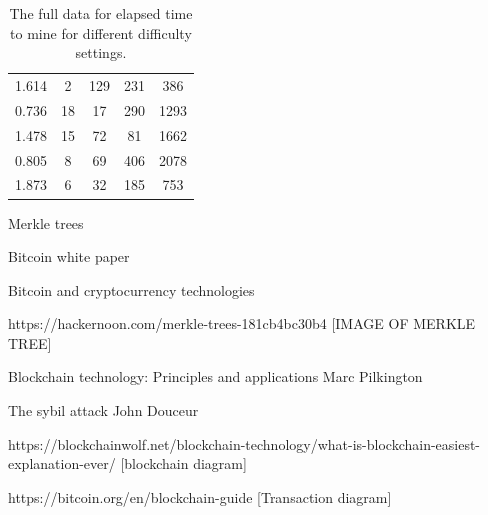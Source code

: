 \documentclass{l4proj}
\begin{document}
\begin{appendices}
\begin{table}[!ht]
\begin{tabular}{ccccc}
    1.614      & 2          & 129        & 231        & 386        \\
    0.736      & 18         & 17         & 290        & 1293       \\
    1.478      & 15         & 72         & 81         & 1662       \\
    0.805      & 8          & 69         & 406        & 2078       \\
    1.873      & 6          & 32         & 185        & 753       
    \end{tabular}
    \vspace{1cm}
    \caption{
        The full data for elapsed time to mine for different difficulty settings.
    }
    \label{tab:mining}
\end{table}
\end{appendices}






Merkle trees

Bitcoin white paper

Bitcoin and cryptocurrency technologies

https://hackernoon.com/merkle-trees-181cb4bc30b4
[IMAGE OF MERKLE TREE] 

Blockchain technology: Principles and applications Marc Pilkington

The sybil attack John Douceur

https://blockchainwolf.net/blockchain-technology/what-is-blockchain-easiest-explanation-ever/ [blockchain diagram]

https://bitcoin.org/en/blockchain-guide [Transaction diagram]
\end{document}
